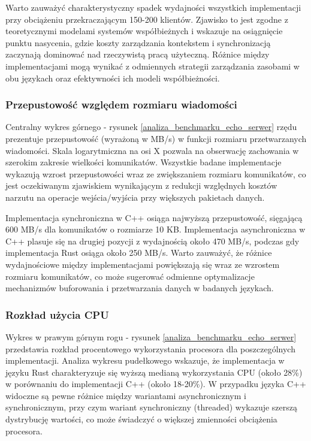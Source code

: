 Warto zauważyć charakterystyczny spadek wydajności wszystkich implementacji przy obciążeniu przekraczającym 150-200 klientów. Zjawisko to jest zgodne z teoretycznymi modelami systemów współbieżnych i wskazuje na osiągnięcie punktu nasycenia, gdzie koszty zarządzania kontekstem i synchronizacją zaczynają dominować nad rzeczywistą pracą użyteczną. Różnice między implementacjami mogą wynikać z odmiennych strategii zarządzania zasobami w obu językach oraz efektywności ich modeli współbieżności.

\subsubsection{Przepustowość względem rozmiaru wiadomości}
Centralny wykres górnego - rysunek \ref{analiza_benchmarku_echo_serwer} rzędu prezentuje przepustowość (wyrażoną w MB/s) w funkcji rozmiaru przetwarzanych wiadomości. Skala logarytmiczna na osi X pozwala na obserwację zachowania w szerokim zakresie wielkości komunikatów. Wszystkie badane implementacje wykazują wzrost przepustowości wraz ze zwiększaniem rozmiaru komunikatów, co jest oczekiwanym zjawiskiem wynikającym z redukcji względnych kosztów narzutu na operacje wejścia/wyjścia przy większych pakietach danych.

Implementacja synchroniczna w C++ osiąga najwyższą przepustowość, sięgającą 600 MB/s dla komunikatów o rozmiarze 10 KB. Implementacja asynchroniczna w C++ plasuje się na drugiej pozycji z wydajnością około 470 MB/s, podczas gdy implementacja Rust osiąga około 250 MB/s. Warto zauważyć, że różnice wydajnościowe między implementacjami powiększają się wraz ze wzrostem rozmiaru komunikatów, co może sugerować odmienne optymalizacje mechanizmów buforowania i przetwarzania danych w badanych językach.

\subsubsection{Rozkład użycia CPU}
Wykres w prawym górnym rogu - rysunek \ref{analiza_benchmarku_echo_serwer} przedstawia rozkład procentowego wykorzystania procesora dla poszczególnych implementacji. Analiza wykresu pudełkowego wskazuje, że implementacja w języku Rust charakteryzuje się wyższą medianą wykorzystania CPU (około 28\%) w porównaniu do implementacji C++ (około 18-20\%). W przypadku języka C++ widoczne są pewne różnice między wariantami asynchronicznym i synchronicznym, przy czym wariant synchroniczny (threaded) wykazuje szerszą dystrybucję wartości, co może świadczyć o większej zmienności obciążenia procesora.

